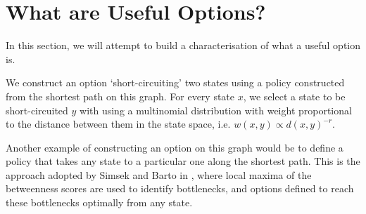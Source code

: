 \section{What are Useful Options?}
\label{sec:useful-options}

In this section, we will attempt to build a characterisation of what a
useful option is.

We construct an option `short-circuiting' two states using a policy constructed
from the shortest path on this graph. For every state $x$, we select a state to
be short-circuited $y$ with using a multinomial distribution with weight
proportional to the distance between them in the state space, i.e. $w(x,y)
\propto d(x,y)^{-r}$. 

Another example of constructing an option on this graph would be to define a
policy that takes any state to a particular one along the shortest path. This is
the approach adopted by Simsek and Barto in \cite{Simsek}, where local maxima of
the betweenness scores are used to identify bottlenecks, and options defined to
reach these bottlenecks optimally from any state.



